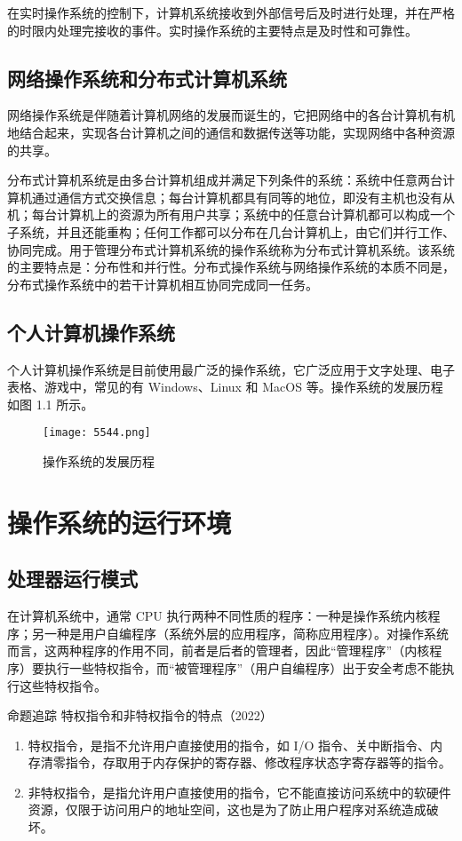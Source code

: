 \documentclass{ctexbook}
\begin{document}
	在实时操作系统的控制下，计算机系统接收到外部信号后及时进行处理，并在严格的时限内处理完接收的事件。实时操作系统的主要特点是及时性和可靠性。
	
	\subsection{网络操作系统和分布式计算机系统}
	网络操作系统是伴随着计算机网络的发展而诞生的，它把网络中的各台计算机有机地结合起来，实现各台计算机之间的通信和数据传送等功能，实现网络中各种资源的共享。
	
	分布式计算机系统是由多台计算机组成并满足下列条件的系统：系统中任意两台计算机通过通信方式交换信息；每台计算机都具有同等的地位，即没有主机也没有从机；每台计算机上的资源为所有用户共享；系统中的任意台计算机都可以构成一个子系统，并且还能重构；任何工作都可以分布在几台计算机上，由它们并行工作、协同完成。用于管理分布式计算机系统的操作系统称为分布式计算机系统。该系统的主要特点是：分布性和并行性。分布式操作系统与网络操作系统的本质不同是，分布式操作系统中的若干计算机相互协同完成同一任务。
	
	\subsection{个人计算机操作系统}
	个人计算机操作系统是目前使用最广泛的操作系统，它广泛应用于文字处理、电子表格、游戏中，常见的有 Windows、Linux 和 MacOS 等。操作系统的发展历程如图 1.1 所示。
	\begin{figure}[h]
		\centering
		\texttt{[image: 5544.png]} %
		\caption{操作系统的发展历程}
	\end{figure}
	
	\section{操作系统的运行环境}
	\subsection{处理器运行模式}
	在计算机系统中，通常 CPU 执行两种不同性质的程序：一种是操作系统内核程序；另一种是用户自编程序（系统外层的应用程序，简称应用程序）。对操作系统而言，这两种程序的作用不同，前者是后者的管理者，因此“管理程序”（内核程序）要执行一些特权指令，而“被管理程序”（用户自编程序）出于安全考虑不能执行这些特权指令。
	
	\colorbox{gray!20}{命题追踪 \enspace 特权指令和非特权指令的特点（2022）}
	\begin{enumerate}
		\item 特权指令，是指不允许用户直接使用的指令，如 I/O 指令、关中断指令、内存清零指令，存取用于内存保护的寄存器、修改程序状态字寄存器等的指令。
		\item 非特权指令，是指允许用户直接使用的指令，它不能直接访问系统中的软硬件资源，仅限于访问用户的地址空间，这也是为了防止用户程序对系统造成破坏。
	\end{enumerate}
	
\end{document}
